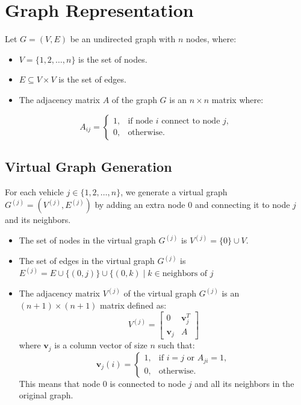 \documentclass[letterpaper, 10pt, conference]{ieeeconf}  %
\begin{document}
\section{Graph Representation}
Let $G = (V, E)$ be an undirected graph with $n$ nodes, where:
\begin{itemize}
    \item $V = \{1, 2, \dots, n\}$ is the set of nodes.
    \item $E \subseteq V \times V$ is the set of edges.
    \item The adjacency matrix $A$ of the graph $G$ is an $n \times n$ matrix where:
\end{itemize}
\begin{equation}
        A_{ij} = \begin{cases}
            1, & \text{if node } i \text{ connect} \text{ to node } j , \\
            0, & \text{otherwise}.
        \end{cases}
    \end{equation}
\subsection{Virtual Graph Generation}
For each vehicle $j \in \{1, 2, \dots, n\}$, we generate a virtual graph $G^{(j)} = (V^{(j)}, E^{(j)})$ by adding an extra node $0$ and connecting it to node $j$ and its neighbors.

\begin{itemize}
    \item The set of nodes in the virtual graph $G^{(j)}$ is $V^{(j)} = \{0\} \cup V$.
    \item  The set of edges in the virtual graph $G^{(j)}$ is $E^{(j)} = E \cup \{(0, j)\} \cup \{(0, k) \mid k \in \text{neighbors of } j$
    \item The adjacency matrix $V^{(j)}$ of the virtual graph $G^{(j)}$ is an $(n+1) \times (n+1)$ matrix defined as:
    \begin{equation}
        V^{(j)} = \begin{bmatrix} 0 & \mathbf{v}_j^T \\ \mathbf{v}_j & A \end{bmatrix}
    \end{equation}
    where $\mathbf{v}_j$ is a column vector of size $n$ such that:
    \begin{equation}
        \mathbf{v}_j(i) = \begin{cases}
            1, & \text{if } i = j \text{ or } A_{ji} = 1, \\
            0, & \text{otherwise}.
        \end{cases}
    \end{equation}
    This means that node $0$ is connected to node $j$ and all its neighbors in the original graph.
\end{itemize}
\end{document}
